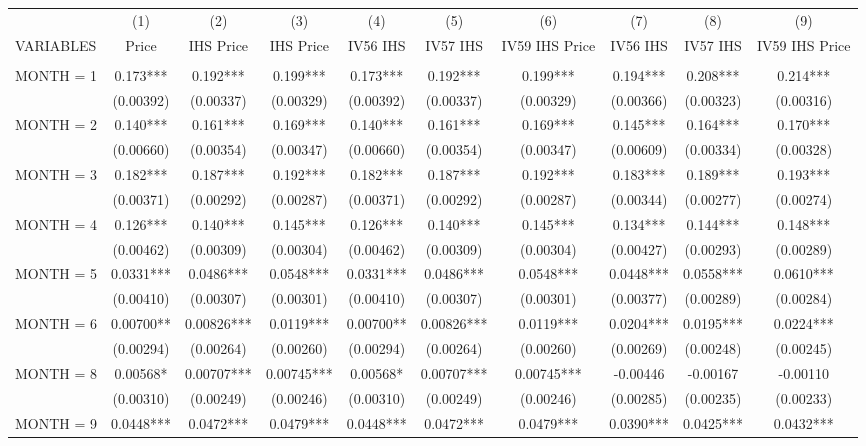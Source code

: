 \begin{tabular}{lccccccccc} \hline
 & (1) & (2) & (3) & (4) & (5) & (6) & (7) & (8) & (9) \\
VARIABLES & Price & IHS Price & IHS Price & IV56 IHS & IV57 IHS & IV59 IHS Price & IV56 IHS & IV57 IHS & IV59 IHS Price \\ \hline
 &  &  &  &  &  &  &  &  &  \\
MONTH = 1 & 0.173*** & 0.192*** & 0.199*** & 0.173*** & 0.192*** & 0.199*** & 0.194*** & 0.208*** & 0.214*** \\
 & (0.00392) & (0.00337) & (0.00329) & (0.00392) & (0.00337) & (0.00329) & (0.00366) & (0.00323) & (0.00316) \\
MONTH = 2 & 0.140*** & 0.161*** & 0.169*** & 0.140*** & 0.161*** & 0.169*** & 0.145*** & 0.164*** & 0.170*** \\
 & (0.00660) & (0.00354) & (0.00347) & (0.00660) & (0.00354) & (0.00347) & (0.00609) & (0.00334) & (0.00328) \\
MONTH = 3 & 0.182*** & 0.187*** & 0.192*** & 0.182*** & 0.187*** & 0.192*** & 0.183*** & 0.189*** & 0.193*** \\
 & (0.00371) & (0.00292) & (0.00287) & (0.00371) & (0.00292) & (0.00287) & (0.00344) & (0.00277) & (0.00274) \\
MONTH = 4 & 0.126*** & 0.140*** & 0.145*** & 0.126*** & 0.140*** & 0.145*** & 0.134*** & 0.144*** & 0.148*** \\
 & (0.00462) & (0.00309) & (0.00304) & (0.00462) & (0.00309) & (0.00304) & (0.00427) & (0.00293) & (0.00289) \\
MONTH = 5 & 0.0331*** & 0.0486*** & 0.0548*** & 0.0331*** & 0.0486*** & 0.0548*** & 0.0448*** & 0.0558*** & 0.0610*** \\
 & (0.00410) & (0.00307) & (0.00301) & (0.00410) & (0.00307) & (0.00301) & (0.00377) & (0.00289) & (0.00284) \\
MONTH = 6 & 0.00700** & 0.00826*** & 0.0119*** & 0.00700** & 0.00826*** & 0.0119*** & 0.0204*** & 0.0195*** & 0.0224*** \\
 & (0.00294) & (0.00264) & (0.00260) & (0.00294) & (0.00264) & (0.00260) & (0.00269) & (0.00248) & (0.00245) \\
MONTH = 8 & 0.00568* & 0.00707*** & 0.00745*** & 0.00568* & 0.00707*** & 0.00745*** & -0.00446 & -0.00167 & -0.00110 \\
 & (0.00310) & (0.00249) & (0.00246) & (0.00310) & (0.00249) & (0.00246) & (0.00285) & (0.00235) & (0.00233) \\
MONTH = 9 & 0.0448*** & 0.0472*** & 0.0479*** & 0.0448*** & 0.0472*** & 0.0479*** & 0.0390*** & 0.0425*** & 0.0432*** \\

\end{tabular}
